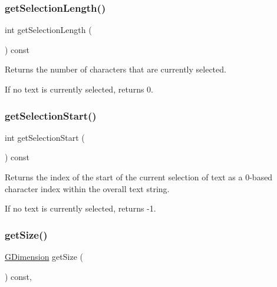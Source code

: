 \subsubsection{\texorpdfstring{get\+Selection\+Length()}{getSelectionLength()}}
{\footnotesize\ttfamily int get\+Selection\+Length (\begin{DoxyParamCaption}{ }\end{DoxyParamCaption}) const\hspace{0.3cm}{\ttfamily [virtual]}}



Returns the number of characters that are currently selected. 

If no text is currently selected, returns 0. \mbox{\label{classGBrowserPane_aad7c986a677c1b9cf445cd7cfb6a8975}} 
\subsubsection{\texorpdfstring{get\+Selection\+Start()}{getSelectionStart()}}
{\footnotesize\ttfamily int get\+Selection\+Start (\begin{DoxyParamCaption}{ }\end{DoxyParamCaption}) const\hspace{0.3cm}{\ttfamily [virtual]}}



Returns the index of the start of the current selection of text as a 0-\/based character index within the overall text string. 

If no text is currently selected, returns -\/1. \mbox{\label{classGInteractor_a7b4eec96a2bdc6420695d5796a78eea9}} 
\subsubsection{\texorpdfstring{get\+Size()}{getSize()}}
{\footnotesize\ttfamily \mbox{\hyperlink{structGDimension}{G\+Dimension}} get\+Size (\begin{DoxyParamCaption}{ }\end{DoxyParamCaption}) const\hspace{0.3cm}{\ttfamily [virtual]}, {\ttfamily [inherited]}}



